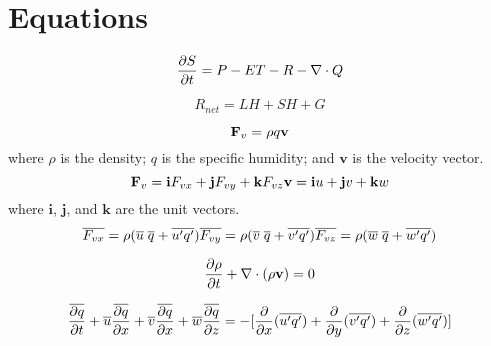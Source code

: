 \documentclass[12pt]{article}
\begin{document}
\section{Equations}

\begin{equation}
\frac{\partial{S}}{\partial{t}}=P - ET - R - \nabla\cdot Q\\
\end{equation}

\begin{equation}
 R_{net} = LH + SH + G
\end{equation}

\begin{equation}
\mathbf{F}_{v} = \rho q \mathbf{v}\\
\end{equation}
where $\rho$ is the density; $q$ is the specific humidity; and $\mathbf{v}$ is the velocity vector.\\


\begin{equation}
\mathbf{F}_{v} = \mathbf{i}F_{vx}+\mathbf{j}F_{vy}+\mathbf{k}F_{vz}\\
%
\mathbf{v} = \mathbf{i}u+\mathbf{j}v+\mathbf{k}w\\
\end{equation}
%
where $\mathbf{i}$,  $\mathbf{j}$, and  $\mathbf{k}$ are the unit vectors.\\

\begin{equation}
\overline{F_{vx}} = \rho(\overline{u}\phantom{.}\overline{q}+\overline{u'q'})\\
%
\overline{F_{vy}} = \rho(\overline{v}\phantom{.}\overline{q}+\overline{v'q'})\\
%
\overline{F_{vz}} = \rho(\overline{w}\phantom{.}\overline{q}+\overline{w'q'})\\
\end{equation}

\begin{equation}
\frac{\partial{\rho}}{\partial{t}}+\nabla\cdot(\rho\mathbf{v})=0\\
\end{equation}

\begin{equation}
\frac{\overline{\partial{q}}}{\partial{t}}+\overline{u}\frac{\overline{\partial{q}}}{\partial{x}}+\overline{v}\frac{\overline{\partial{q}}}{\partial{x}}+\overline{w}
%
\frac{\overline{\partial{q}}}{\partial{z}} = -[\frac{\partial{}}{\partial{x}}(\overline{u'q'})+\frac{\partial{}}{\partial{y}}(\overline{v'q'})+\frac{\partial{}}{\partial{z}}(\overline{w'q'})]\\
\end{equation}
\end{document}
